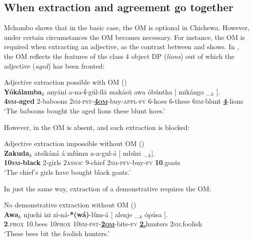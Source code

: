 \documentclass[output=paper,colorlinks,citecolor=brown]{langscibook}
\begin{document}
\subsection{When extraction and agreement go together}\label{sec:branan:3.1}

Mchombo shows that in the basic case, the OM is optional in Chichewa. However, under certain circumstances the OM becomes necessary. For instance, the OM is required when extracting an adjective, as the contrast between  and  shows. In , the OM reflects the features of the class 4 object DP (\textit{lions}) out of which the adjective (\textit{aged}) has been fronted:

\ea%
    \label{ex:branan:5}
    Adjective extraction possible with OM \hfill{(\citealt[ex. 21b]{Mchombo2004})}\\
    \gll    \textbf{Y\'{o}k\'{a}lamba}$_{k}$ any\'{a}n\'{i} a-na-\textbf{\'{i}}-g\'{u}l-\'{i}l\'{a} mak\'{a}s\'{u} awa \'{o}b\'{u}ntha [ mik\'{a}ngo  \_$_{k}$ ].   \\
             \textbf{4\textsc{sm}-aged} 2-baboons 2\textsc{sm-pst}-\underline{\textbf{4\textsc{om}}}-buy-\textsc{appl-fv} 6-hoes 6-these 6\textsc{sm}-blunt {}  \underline{\textbf{4}}-lions \\
    \glt    `The baboons  bought the aged lions these blunt hoes.'
\z

However, in  the OM is absent, and such extraction is blocked:

\ea%
    \label{ex:branan:6}
    Adjective extraction impossible without OM  \hfill{(\citealt[ex. 4a]{Mchombo2006})}\\
    \gll    * \textbf{Zakuda}$_{k}$ ats\'{i}k\'{a}n\'{a} \'{a} mf\'{u}mu a-a-gul-\'{a} [ mb\^{u}zi   \_$_{k}$].   \\
            {} \textbf{10\textsc{sm}-black} 2-girls 2\textsc{assoc} 9-chief 2\textsc{sm-pfv}-buy-\textsc{fv} {} \textbf{10}.goats {} \\
    \glt    `The chief's girls have bought black goats.'
\z

In just the same way, extraction of a demonstrative requires the OM:

\ea%
    \label{ex:branan:7}
    No demonstrative extraction without OM \hfill{(\citealt[ex. 2b–c]{Mchombo2006})}\\
    \gll    \textbf{Awa}$_{k}$ njuchi izi zi-n\'{a}-\textbf{*(w\'{a})}-l\^{u}m-\'{a} [ alenje \_$_{k}$ \'{o}p\'{u}sa  ].\\
            \textbf{2}.\textsc{prox} 10.bees 10\textsc{prox} 10\textsc{sm-pst}-\underline{\textbf{2\textsc{om}}}-bite-\textsc{fv} {} \underline{\textbf{2.}}hunters {} 2\textsc{sm}.foolish {}\\
    \glt    `These bees bit the foolish hunters.'
\z
\end{document}
